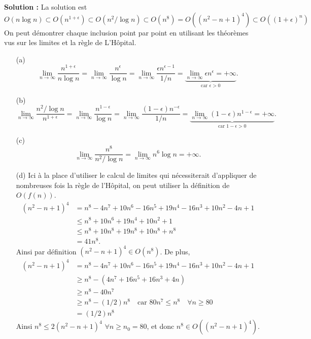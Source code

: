 \documentclass[11pt]{article} %
\newenvironment{solution}[1][\unskip]{%
	\par
	\noindent
	\textbf{Solution #1:}
	\noindent}
{\medskip}
\begin{document}
\begin{solution}
	La solution est
	\begin{equation*}
	O(n\log n) \subset O(n^{1+\epsilon}) \subset O(n^2/\log n) \subset O(n^8) = O((n^2-n+1)^4) \subset O((1+\epsilon)^n)
	\end{equation*}
	On peut démontrer chaque inclusion point par point en utilisant les théorèmes vus sur les limites et la règle de L'Hôpital.
	\begin{itemize}
		\item[(a)] \begin{equation*}
		\lim\limits_{n\rightarrow \infty}\frac{n^{1+\epsilon}}{n\log n}
		=\lim\limits_{n\rightarrow \infty}\frac{n^{\epsilon}}{\log n}
		=\lim\limits_{n\rightarrow \infty}\frac{\epsilon n^{\epsilon-1}}{1/n}
		=\underbrace{\lim\limits_{n\rightarrow \infty}\epsilon n^{\epsilon}=+\infty}_{\text{car }\epsilon>0}.
		\end{equation*}
		\item[(b)] 
		\begin{equation*}
		\lim\limits_{n\rightarrow \infty}\frac{n^2/\log n}{n^{1+\epsilon}}
		=\lim\limits_{n\rightarrow \infty}\frac{n^{1-\epsilon}}{\log n}
		=\lim\limits_{n\rightarrow \infty}\frac{(1-\epsilon)n^{-\epsilon}}{1/n}
		=\underbrace{\lim\limits_{n\rightarrow \infty}{(1-\epsilon)n^{1-\epsilon}}=+\infty}_{\text{car }1-\epsilon>0}.
		\end{equation*}
		\item[(c)]
		\begin{equation*}
		\lim\limits_{n\rightarrow \infty}\frac{n^8}{n^2/\log n}
		=\lim\limits_{n\rightarrow \infty}n^6 \log n = +\infty.
		\end{equation*} 
		\item[(d)] Ici à la place d'utiliser le calcul de limites qui nécessiterait d'appliquer de nombreuses fois la règle de l'Hôpital, on peut utiliser la définition de $O(f(n))$.
		\begin{align*} 
		(n^2 - n +1)^4 &= n^8 -4n^7 +10n^6 -16n^5 + 19n^4 -16n^3 +10n^2 -4n +1\\
		&\leq n^8+10n^6 + 19n^4 +10n^2 + 1\\
		&\leq n^8 + 10n^8 +19n^8 +10n^8 + n^8\\
		&=41n^8.
		\end{align*}
		Ainsi par définition $(n^2 - n +1)^4 \in O(n^8)$. De plus,
		\begin{align*}
		(n^2 - n +1)^4 &= n^8 -4n^7 +10n^6 -16n^5 + 19n^4 -16n^3 +10n^2 -4n +1\\
		&\geq n^8 - (4n^7+16n^5+16n^3+4n)\\
		&\geq n^8 - 40n^7\\
		&\geq n^8 - (1/2)n^8 \quad \text{car }80n^7 \leq n^8 \quad \forall n\geq 80\\
		&=(1/2)n^8
		\end{align*}
		Ainsi $n^8 \leq 2(n^2-n+1)^4$ $\forall n\geq n_0=80$, et donc $n^8 \in O((n^2-n+1)^4)$.


\end{itemize}
\end{solution}
\end{document}
